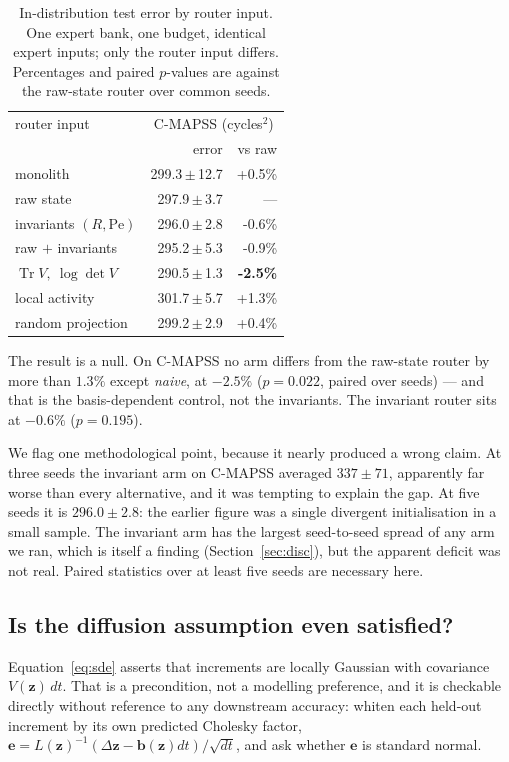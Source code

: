 \documentclass[11pt]{article}
\newcommand{\Pen}{\mathrm{Pe}}
\newcommand{\Trr}{\operatorname{Tr}}
\newcommand{\z}{\bm{z}}
\begin{document}
\begin{table}[t]
\centering
\small
\caption{In-distribution test error by router input. One expert bank, one budget, identical expert inputs; only the router input differs. Percentages and paired $p$-values are against the raw-state router over common seeds.}
\label{tab:results}
\begin{tabular}{lrr}
\toprule
router input & \multicolumn{2}{c}{C-MAPSS (cycles$^2$)} \\
 & error & vs raw \\
\midrule
monolith & 299.3\,$\pm$\,12.7 & +0.5\% \\
raw state & 297.9\,$\pm$\,3.7 & --- \\
invariants $(R,\Pen)$ & 296.0\,$\pm$\,2.8 & -0.6\% \\
raw $+$ invariants & 295.2\,$\pm$\,5.3 & -0.9\% \\
$\Trr V,\ \log\det V$ & 290.5\,$\pm$\,1.3 & \textbf{-2.5\%} \\
local activity & 301.7\,$\pm$\,5.7 & +1.3\% \\
random projection & 299.2\,$\pm$\,2.9 & +0.4\% \\
\bottomrule
\end{tabular}
\end{table}


The result is a null. On C-MAPSS no arm differs from the raw-state router by
more than $1.3\%$ except \emph{naive}, at $-2.5\%$ ($p=0.022$, paired over
seeds) --- and that is the basis-dependent control, not the invariants. The
invariant router sits at $-0.6\%$ ($p=0.195$).

We flag one methodological point, because it nearly produced a wrong claim. At
three seeds the invariant arm on C-MAPSS averaged $337\pm71$, apparently far
worse than every alternative, and it was tempting to explain the gap. At five
seeds it is $296.0\pm2.8$: the earlier figure was a single divergent
initialisation in a small sample. The invariant arm has the largest
seed-to-seed spread of any arm we ran, which is itself a finding
(Section~\ref{sec:disc}), but the apparent deficit was not real. Paired
statistics over at least five seeds are necessary here.

\subsection{Is the diffusion assumption even satisfied?}
\label{sec:precondition}

Equation~\eqref{eq:sde} asserts that increments are locally Gaussian with
covariance $V(\z)\,dt$. That is a precondition, not a modelling preference, and
it is checkable directly without reference to any downstream accuracy: whiten
each held-out increment by its own predicted Cholesky factor,
$\bm{e}=L(\z)^{-1}(\Delta\z-\bm{b}(\z)dt)/\sqrt{dt}$, and ask whether $\bm{e}$
is standard normal.
\end{document}
